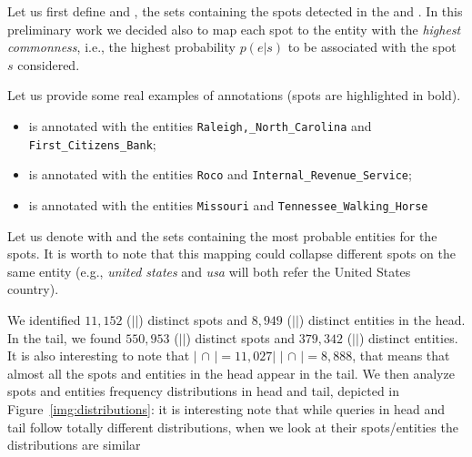 Let us first define \shead{} and \stail{}, the sets containing the spots detected in the 
\head{} and \tail{}. In this preliminary work we decided also to map each spot 
to the entity with the \emph{highest commonness}, i.e., the highest probability $p(e|s)$
to be associated with the spot $s$ considered.

Let us provide some real examples of annotations (spots are highlighted in bold).
\begin{itemize}
\item {} is annotated with the entities 
\texttt{Raleigh,\_North\_Carolina} and \\ \texttt{First\_Citizens\_Bank};
\item {} is annotated with the entities \texttt{Roco} and
\texttt{Internal\_Revenue\_Service};
\item {} is annotated with the entities  \texttt{Missouri} and  \texttt{Tennessee\_Walking\_Horse}
\end{itemize}


Let us denote with \ehead{} and \etail{}
the sets containing the most probable entities for the spots. It is worth to note
that this mapping could collapse different spots on the same entity (e.g., \emph{united states} and 
\emph{usa} will both refer the United States country). 

We identified $11,152$ ($|$\shead{}$|$)  distinct spots and $8,949$ ($|$\ehead{}$|$) distinct 
entities in the head. In the tail, we found $550,953$ ($|$\stail{}$|$) distinct spots and 
$379,342$ ($|$\etail{}$|$) distinct entities. It  is also interesting to note that 
$|$  \shead{} $\cap$ \stail{} $| = 11,027 |$  $|$ \ehead{} $\cap$ \etail{} $| = 8,888$, that 
means that almost all the spots and entities in the head appear in the tail. 
We then analyze spots and entities frequency distributions in head and tail, 
depicted in Figure~\ref{img:distributions}: it is interesting note that while queries 
in head and tail follow totally different distributions, when we look at their 
spots/entities the distributions are similar 

